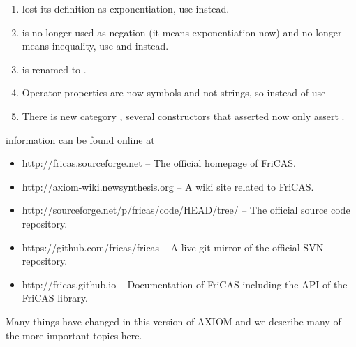 \begin{enumerate}
\item \spad{**} lost its definition as exponentiation, use \spadop{^}
  instead.

\item \spadop{^} is no longer used as negation (it means exponentiation
  now) and \spadop{^=} no longer means inequality, use  and
  \spad{~=} instead.

\item {} is renamed to .

\item Operator properties are now symbols and not strings, so instead
  of  use 

\item There is new category , several constructors
  that asserted  now only assert .
\end{enumerate}


\Language{} information can be found online at
\begin{itemize}
\item {http://fricas.sourceforge.net} -- The official homepage of
  FriCAS.
\item {http://axiom-wiki.newsynthesis.org} -- A wiki site related to
  FriCAS.
\item {http://sourceforge.net/p/fricas/code/HEAD/tree/} -- The
  official source code repository.
\item {https://github.com/fricas/fricas} -- A live git mirror of
  the official SVN repository.
\item {http://fricas.github.io} -- Documentation of FriCAS including
  the API of the FriCAS library.
\end{itemize}


Many things have changed in this version of AXIOM and
we describe many of the more important topics here.

